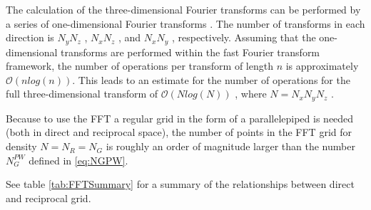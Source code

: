 \documentclass[a4paper,12pt]{article}
\begin{document}
The calculation of the three-dimensional Fourier transforms can be performed by a
series of one-dimensional Fourier transforms \cite{Marx}. The number of transforms in
each direction is $N_y N_z$ , $N_x N_z$ , and $N_x N_y$ , respectively. Assuming that the
one-dimensional transforms are performed within the fast Fourier transform
framework, the number of operations per transform of length $n$ is approximately $\mathcal{O}(n log(n))$. This leads to an estimate for the number of operations for the full three-dimensional transform of $\mathcal{O}(N log(N))$ , where $N = N_x N_y N_z$ .

Because to use the FFT a regular grid in the form of a parallelepiped is needed (both in direct and reciprocal space), the number of points in the FFT grid for density $N = N_{R} = N_{G}$ is roughly an order of magnitude larger than the number $N_{G}^{PW}$ defined in \eqref{eq:NGPW}.

See table \ref{tab:FFTSummary} for a summary of the relationships between direct and reciprocal grid.
\end{document}
